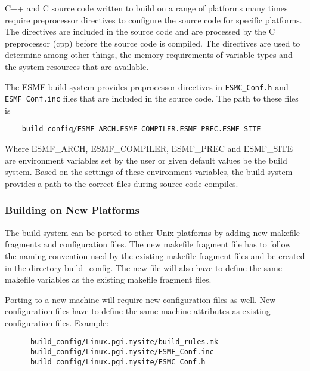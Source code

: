C++ and C source code written to build on a range of platforms many
times require preprocessor directives to configure the source code for
specific platforms.  The directives are included in the source code
and are processed by the C preprocessor (cpp) before the source code
is compiled.  The directives are used to determine among other things,
the memory requirements of variable types and the system resources
that are available.

The ESMF build system provides preprocessor directives in 
{\tt ESMC\_Conf.h} and {\tt ESMF\_Conf.inc} files
that are included in the source code.  The path to these files is

\begin{verbatim}
    build_config/ESMF_ARCH.ESMF_COMPILER.ESMF_PREC.ESMF_SITE
\end{verbatim}

Where ESMF\_ARCH, ESMF\_COMPILER, ESMF\_PREC and ESMF\_SITE are
environment variables set by the user or given default values be the
build system.  Based on the settings of these environment variables,
the build system provides a path to the correct files during
source code compiles.

\subsubsection{Building on New Platforms}

The build system can be ported to other Unix platforms by adding new
makefile fragments and configuration files.  The new makefile fragment 
file has to follow the naming
convention used by the existing makefile fragment files and be created in the
directory build\_config.  The new file will also have to define
the same makefile variables as the existing makefile fragment files.

Porting to a new machine will require new configuration files as well. 
New configuration files have to define the same machine attributes as
existing configuration files. Example:

\begin{verbatim}
      build_config/Linux.pgi.mysite/build_rules.mk
      build_config/Linux.pgi.mysite/ESMF_Conf.inc
      build_config/Linux.pgi.mysite/ESMC_Conf.h
\end{verbatim}

